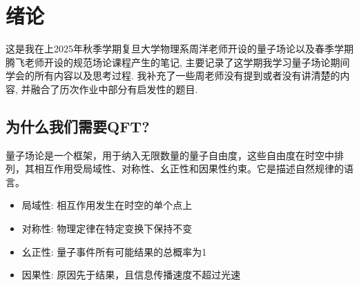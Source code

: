 \section{绪论}
这是我在上2025年秋季学期复旦大学物理系周洋老师开设的量子场论以及春季学期腾飞老师开设的规范场论课程产生的笔记, 主要记录了这学期我学习量子场论期间学会的所有内容以及思考过程. 我补充了一些周老师没有提到或者没有讲清楚的内容, 并融合了历次作业中部分有启发性的题目.
\subsection{为什么我们需要QFT?}
量子场论是一个框架，用于纳入无限数量的量子自由度，这些自由度在时空中排列，其相互作用受局域性、对称性、幺正性和因果性约束。它是描述自然规律的语言。\cite{qft:lecture1}
\begin{itemize}
    \item 局域性: 相互作用发生在时空的单个点上
    \item 对称性: 物理定律在特定变换下保持不变
    \item 幺正性: 量子事件所有可能结果的总概率为1
    \item 因果性: 原因先于结果，且信息传播速度不超过光速
\end{itemize}
